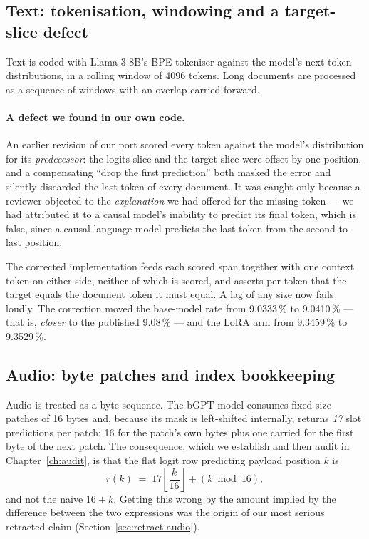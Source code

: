 \documentclass[11pt,a4paper]{article}
\begin{document}
\subsection{Text: tokenisation, windowing and a target-slice defect}

Text is coded with Llama-3-8B's BPE tokeniser against the model's
next-token distributions, in a rolling window of 4096 tokens. Long documents are
processed as a sequence of windows with an overlap carried forward.

\paragraph{A defect we found in our own code.} An earlier revision of our port
scored every token against the model's distribution for its \emph{predecessor}:
the logits slice and the target slice were offset by one position, and a
compensating ``drop the first prediction'' both masked the error and silently
discarded the last token of every document. It was caught only because a reviewer
objected to the \emph{explanation} we had offered for the missing token --- we had
attributed it to a causal model's inability to predict its final token, which is
false, since a causal language model predicts the last token from the
second-to-last position.

The corrected implementation feeds each scored span together with one context
token on either side, neither of which is scored, and asserts per token that the
target equals the document token it must equal. A lag of any size now fails
loudly. The correction moved the base-model rate from \num{9.0333}\,\% to
\num{9.0410}\,\% --- that is, \emph{closer} to the published \num{9.08}\,\% ---
and the LoRA arm from \num{9.3459}\,\% to \num{9.3529}\,\%.

\subsection{Audio: byte patches and index bookkeeping}

Audio is treated as a byte sequence. The bGPT model consumes fixed-size patches
of \num{16} bytes and, because its mask is left-shifted internally, returns
\emph{17} slot predictions per patch: 16 for the patch's own bytes plus one
carried for the first byte of the next patch. The consequence, which we establish
and then audit in Chapter~\ref{ch:audit}, is that the flat logit row predicting
payload position $k$ is
\begin{equation}
r(k) \;=\; 17\left\lfloor \frac{k}{16}\right\rfloor + \left(k \bmod 16\right),
\label{eq:rowindex}
\end{equation}
and not the na\"ive $16+k$. Getting this wrong by the amount implied by the
difference between the two expressions was the origin of our most serious
retracted claim (Section~\ref{sec:retract-audio}).
\end{document}

